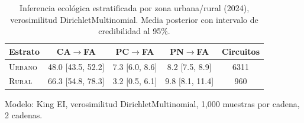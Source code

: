 
\begin{table}[htbp]
\centering
\caption{Inferencia ecológica estratificada por zona urbana/rural (2024), verosimilitud DirichletMultinomial. Media posterior con intervalo de credibilidad al 95\%.}
\label{tab:stratified_dm_urbano_rural_2024}
\small
\begin{tabular}{lcccc}
\toprule
Estrato & CA$\to$FA & PC$\to$FA & PN$\to$FA & Circuitos \\
\midrule
\textsc{Urbano} & 48.0 [43.5, 52.2] & 7.3 [6.0, 8.6] & 8.2 [7.5, 8.9] & 6311 \\
\textsc{Rural} & 66.3 [54.8, 78.3] & 3.2 [0.5, 6.1] & 9.8 [8.1, 11.4] & 960 \\
\bottomrule
\end{tabular}
\begin{tablenotes}\small
\item Modelo: King EI, verosimilitud DirichletMultinomial, 1{,}000 muestras por cadena, 2 cadenas.
\end{tablenotes}
\end{table}

